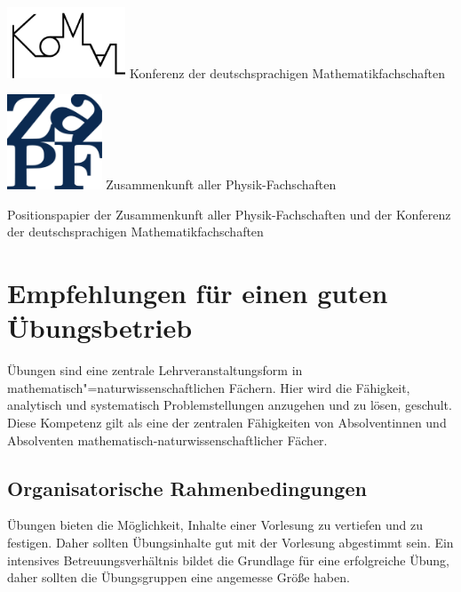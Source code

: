 \documentclass[DIV=calc]{scrartcl}
\begin{document}
\begin{minipage}{120pt}
\vspace{-2cm}
\includegraphics[width=100pt]{komaLogo.png}
\centering
\small Konferenz der deutschsprachigen Mathematikfachschaften
\end{minipage}
\hfill
\begin{minipage}{120pt}
\vspace{-2cm}
\includegraphics[width=80pt]{zapf_logo.pdf}
\centering
\small Zusammenkunft aller Physik-Fachschaften
\end{minipage}
\begin{center}
\huge{Positionspapier der Zusammenkunft aller Physik-Fachschaften und der Konferenz der deutschsprachigen Mathematikfachschaften} \\
\normalsize
\end{center}

\section*{Empfehlungen für einen guten Übungsbetrieb}
Übungen sind eine zentrale Lehrveranstaltungsform in
mathematisch"=naturwissenschaftlichen Fächern. Hier wird die Fähigkeit,
analytisch und systematisch Problemstellungen anzugehen und zu lösen, geschult.
Diese Kompetenz gilt als eine der zentralen Fähigkeiten von Absolventinnen und
Absolventen mathematisch-naturwissenschaftlicher Fächer.

\subsection*{Organisatorische Rahmenbedingungen}
Übungen bieten die Möglichkeit, Inhalte einer Vorlesung zu vertiefen und zu
festigen. Daher sollten Übungsinhalte gut mit der Vorlesung abgestimmt sein.
Ein intensives Betreuungsverhältnis bildet die Grundlage für eine erfolgreiche
Übung, daher sollten die Übungsgruppen eine angemesse Größe haben.
\end{document}
